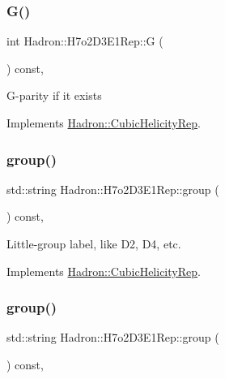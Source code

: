 \subsubsection{\texorpdfstring{G()}{G()}\hspace{0.1cm}{\footnotesize\ttfamily [3/3]}}
{\footnotesize\ttfamily int Hadron\+::\+H7o2\+D3\+E1\+Rep\+::G (\begin{DoxyParamCaption}{ }\end{DoxyParamCaption}) const\hspace{0.3cm}{\ttfamily [inline]}, {\ttfamily [virtual]}}

G-\/parity if it exists 

Implements \mbox{\hyperlink{structHadron_1_1CubicHelicityRep_a50689f42be1e6170aa8cf6ad0597018b}{Hadron\+::\+Cubic\+Helicity\+Rep}}.

\mbox{\label{structHadron_1_1H7o2D3E1Rep_a9a25c1c49d874a36ad6a3c82522d0482}} 
\subsubsection{\texorpdfstring{group()}{group()}\hspace{0.1cm}{\footnotesize\ttfamily [1/5]}}
{\footnotesize\ttfamily std\+::string Hadron\+::\+H7o2\+D3\+E1\+Rep\+::group (\begin{DoxyParamCaption}{ }\end{DoxyParamCaption}) const\hspace{0.3cm}{\ttfamily [inline]}, {\ttfamily [virtual]}}

Little-\/group label, like D2, D4, etc. 

Implements \mbox{\hyperlink{structHadron_1_1CubicHelicityRep_a101a7d76cd8ccdad0f272db44b766113}{Hadron\+::\+Cubic\+Helicity\+Rep}}.

\mbox{\label{structHadron_1_1H7o2D3E1Rep_a9a25c1c49d874a36ad6a3c82522d0482}} 
\subsubsection{\texorpdfstring{group()}{group()}\hspace{0.1cm}{\footnotesize\ttfamily [2/5]}}
{\footnotesize\ttfamily std\+::string Hadron\+::\+H7o2\+D3\+E1\+Rep\+::group (\begin{DoxyParamCaption}{ }\end{DoxyParamCaption}) const\hspace{0.3cm}{\ttfamily [inline]}, {\ttfamily [virtual]}}

